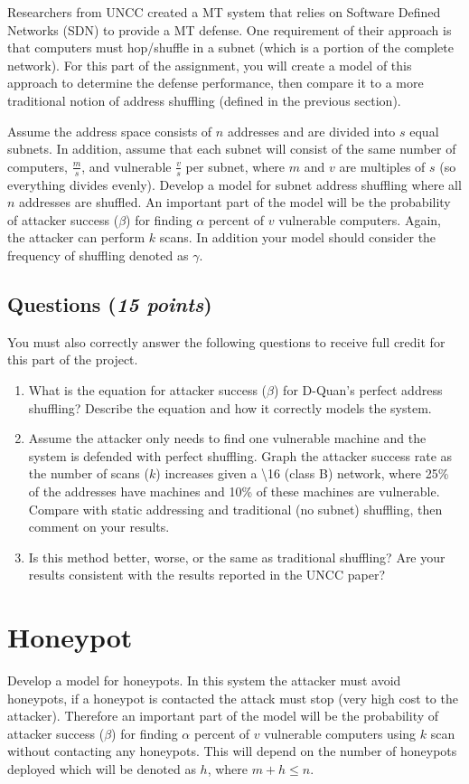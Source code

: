 \documentclass[10pt]{article}
\newcommand{\Questions}[1]{
\subsection*{Questions {\rm \normalsize (\textsf{\textit{#1 points}})}}
}
\begin{document}
Researchers from UNCC created a MT system that relies on Software Defined Networks (SDN) to provide a MT defense. One requirement of their approach is that computers must hop/shuffle in a subnet (which is a portion of the complete network). For this part of the assignment, you will create a model of this approach to determine the defense performance, then compare it to a more traditional notion of address shuffling (defined in the previous section).

Assume the address space consists of $n$ addresses and are divided into $s$ equal subnets. In addition, assume that each subnet will consist of the same number of computers, $\frac{m}{s}$, and vulnerable $\frac{v}{s}$ per subnet, where $m$ and $v$ are multiples of $s$ (so everything divides evenly). Develop a model for subnet address shuffling where all $n$ addresses are shuffled. An important part of the model will be the probability of attacker success ($\beta$) for finding $\alpha$ percent of $v$ vulnerable computers. Again, the attacker can perform $k$ scans. In addition your model should consider the frequency of shuffling denoted as $\gamma$.

\Questions{15}
You must also correctly answer the following questions to receive full credit for this part of the project.
\begin{enumerate}
  \item What is the equation for attacker success ($\beta$) for D-Quan's perfect address shuffling? Describe the equation and how it correctly models the system.
  \item Assume the attacker only needs to find one vulnerable machine and the system is defended with perfect shuffling. Graph the attacker success rate as the number of scans ($k$) increases given a  \textbackslash 16 (class B) network, where 25\% of the addresses have machines and 10\% of these machines are vulnerable. Compare with static addressing and traditional (no subnet) shuffling, then comment on your results.
  \item Is this method better, worse, or the same as traditional shuffling? Are your results consistent with the results reported in the UNCC paper?

\end{enumerate}


\section{Honeypot}

Develop a model for honeypots. In this system the attacker must avoid honeypots, if a honeypot is contacted the attack must stop (very high cost to the attacker). Therefore an important part of the model will be the probability of attacker success ($\beta$) for finding $\alpha$ percent of $v$ vulnerable computers using $k$ scan without contacting any honeypots. This will depend on the number of honeypots deployed which will be denoted as $h$, where $m+h \leq n$.
\end{document}
